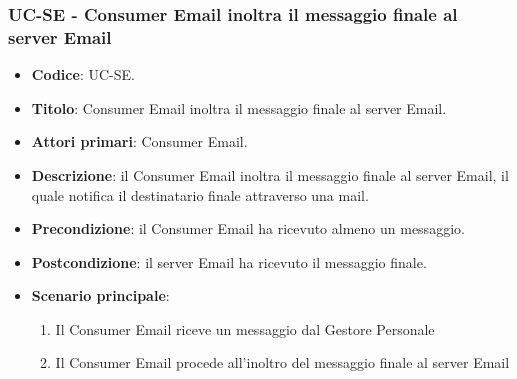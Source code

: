 \subsubsection{UC\theuccount-SE - Consumer Email inoltra il messaggio finale al server Email}
	\begin{itemize}
		\item \textbf{Codice}: UC\theuccount-SE.
		\item \textbf{Titolo}: Consumer Email inoltra il messaggio finale al server Email.
		\item \textbf{Attori primari}: Consumer Email.
		\item \textbf{Descrizione}: il Consumer Email inoltra il messaggio finale al server Email, il quale notifica il destinatario finale attraverso una mail.
		\item \textbf{Precondizione}: il Consumer Email ha ricevuto almeno un messaggio.
		\item \textbf{Postcondizione}: il server Email ha ricevuto il messaggio finale.
		\item \textbf{Scenario principale}: 
		\begin{enumerate}
			\item Il Consumer Email riceve un messaggio dal Gestore Personale
			\item Il Consumer Email procede all'inoltro del messaggio finale al server Email
		\end{enumerate}
		
	\end{itemize}